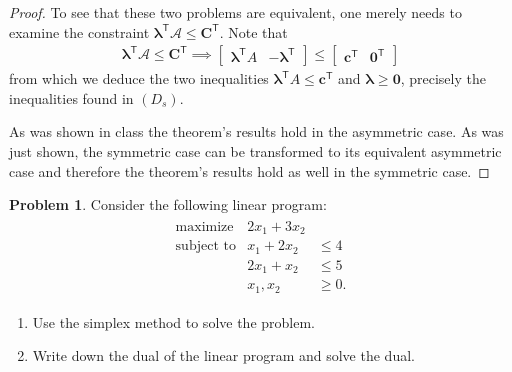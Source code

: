 \documentclass[12pt]{article}
\theoremstyle{definition}
\newtheorem{problem}{Problem}
\newcommand{\vc}[1]{\boldsymbol{#1}}
\newcommand{\tran}{\mathsf{T}}
\begin{document}
\begin{proof}
  To see that these two problems are equivalent, one merely needs to examine the constraint $\vc{\lambda}^\tran\mathscr{A} \leq \vc{C}^\tran$.
  Note that
  \begin{align*}
    \vc{\lambda}^\tran\mathscr{A} \leq \vc{C}^\tran \implies \begin{bmatrix}\vc{\lambda}^\tran A & -\vc{\lambda}^\tran\end{bmatrix} \leq \begin{bmatrix}\vc{c}^\tran & \vc{0}^\tran\end{bmatrix}
  \end{align*}
  from which we deduce the two inequalities $\vc{\lambda}^\tran A \leq \vc{c}^\tran$ and $\vc{\lambda} \geq \vc{0}$, precisely the inequalities found in $(D_s)$.


  As was shown in class the theorem's results hold in the asymmetric case. As was just shown, the symmetric case
  can be transformed to its equivalent asymmetric case and therefore the theorem's results hold as well in the symmetric case.
\end{proof}
\newpage


\begin{problem}
  Consider the following linear program:
  \begin{align*}
    \begin{array}{rrl}
      \text{maximize} & 2x_1 + 3x_2 & \\
      \text{subject to} & x_1 + 2x_2 &\leq 4 \\
      & 2x_1 + x_2 &\leq 5 \\
      & x_1, x_2 &\geq 0.
    \end{array}
  \end{align*}
  \begin{enumerate}
    \item Use the simplex method to solve the problem.
    \item Write down the dual of the linear program and solve the dual.
  \end{enumerate}
\end{problem}
\end{document}
